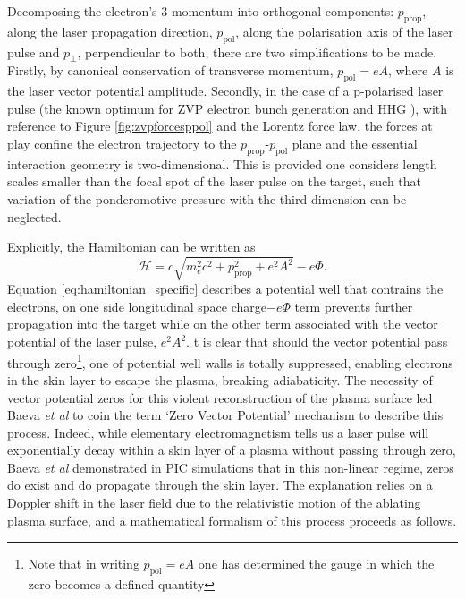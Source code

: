Decomposing the electron's 3-momentum into orthogonal components: $p_\mathrm{prop}$, along the laser propagation direction, $p_\mathrm{pol}$, along the polarisation axis of the laser pulse and $p_\perp$, perpendicular to both, there are two simplifications to be made. Firstly, by canonical conservation of transverse momentum, $p_\mathrm{pol} = eA$, where $A$ is the laser vector potential amplitude. Secondly, in the case of a p-polarised laser pulse (the known optimum for ZVP electron bunch generation \cite{savinAttosecondscaleAbsorptionExtreme2017} and \ac{HHG} \cite{baevaTheoryHighorderHarmonic2006}), with reference to Figure \ref{fig:zvpforcesppol} and the Lorentz force law, the forces at play confine the electron trajectory to the $p_\mathrm{prop}$-$p_\mathrm{pol}$ plane and the essential interaction geometry is two-dimensional. This is provided one considers length scales smaller than the focal spot of the laser pulse on the target, such that variation of the ponderomotive pressure with the third dimension can be neglected.

Explicitly, the Hamiltonian can be written as
\begin{equation}\label{eq:hamiltonian_specific}
	\mathcal{H} = c\sqrt{m^2_ec^2 + p^2_\mathrm{prop} + e^2A^2} - e\Phi.
\end{equation}
Equation \ref{eq:hamiltonian_specific} describes a potential well that contrains the electrons, on one side longitudinal space charge$- e\Phi$ term prevents further propagation into the target while on the other term associated with the vector potential of the laser pulse, $ e^2A^2$. t is clear that should the vector potential pass through zero\footnote{Note that in writing $p_\mathrm{pol} = eA$ one has determined the gauge in which the zero becomes a defined quantity}, one of potential well walls is totally suppressed, enabling electrons in the skin layer to escape the plasma, breaking adiabaticity. The necessity of vector potential zeros for this violent reconstruction of the plasma surface led Baeva \textit{et al} \cite{baevaZeroVectorPotential2011} to coin the term `Zero Vector Potential' mechanism to describe this process. Indeed, while elementary electromagnetism tells us a laser pulse will exponentially decay within a skin layer of a plasma without passing through zero, Baeva \textit{et al} \cite{baevaZeroVectorPotential2011} demonstrated in \ac{PIC} simulations that in this non-linear regime, zeros do exist and do propagate through the skin layer. The explanation relies on a Doppler shift in the laser field due to the relativistic motion of the ablating plasma surface, and a mathematical formalism of this process proceeds as follows.

